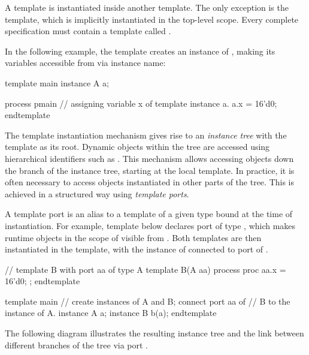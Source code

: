 A template is instantiated inside another template.  The only 
exception is the  template, which is implicitly 
instantiated in the top-level scope.  Every complete \tsl 
specification must contain a template called .  

In the following example, the  template creates an 
instance of , making its variables accessible from 
 via instance name:
\begin{tsllisting2}
template main
  instance A a;

  process pmain {
    // assigning variable x of template instance a.
    a.x = 16'd0;
  }
endtemplate
\end{tsllisting2}

The template instantiation mechanism gives rise to an 
\emph{instance tree} with the  template as its root.  
Dynamic objects within the tree are accessed using hierarchical 
identifiers such as .  This mechanism allows accessing 
objects down the branch of the instance tree, starting at the 
local template.  In practice, it is often necessary to access 
objects instantiated in other parts of the tree.  This is achieved 
in a structured way using \emph{template ports}.  

A template port is an alias to a template of a given type bound at 
the time of instantiation.  For example, template  below 
declares port  of type , which makes runtime 
objects in the scope of  visible from .  Both 
templates are then instantiated in the  template, with 
the instance of  connected to port  of .
\begin{tsllisting2}
// template B with port aa of type A
template B(A aa)
  process proc {
    aa.x = 16'd0;
  };
endtemplate

template main
  // create instances of A and B; connect port aa of
  // B to the instance of A.
  instance A a;
  instance B b(a);
endtemplate
\end{tsllisting2}

The following diagram illustrates the resulting instance tree and 
the link between different branches of the tree via port .


